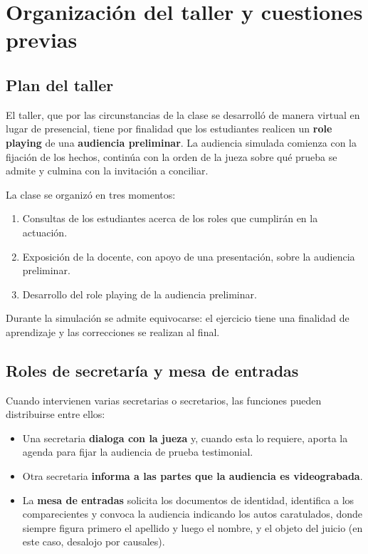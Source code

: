 \documentclass[12pt,oneside]{book}
\begin{document}
\tableofcontents

\chapter[Organización del taller y cuestiones previas]{Organización del taller y cuestiones previas}

\section{Plan del taller}

El taller, que por las circunstancias de la clase se desarrolló de manera virtual en lugar de presencial, tiene por finalidad que los estudiantes realicen un \textbf{role playing} de una \textbf{audiencia preliminar}. La audiencia simulada comienza con la fijación de los hechos, continúa con la orden de la jueza sobre qué prueba se admite y culmina con la invitación a conciliar.

La clase se organizó en tres momentos:

\begin{enumerate}
    \item Consultas de los estudiantes acerca de los roles que cumplirán en la actuación.
    \item Exposición de la docente, con apoyo de una presentación, sobre la audiencia preliminar.
    \item Desarrollo del role playing de la audiencia preliminar.
\end{enumerate}

Durante la simulación se admite equivocarse: el ejercicio tiene una finalidad de aprendizaje y las correcciones se realizan al final.

\section{Roles de secretaría y mesa de entradas}

Cuando intervienen varias secretarias o secretarios, las funciones pueden distribuirse entre ellos:

\begin{itemize}
    \item Una secretaria \textbf{dialoga con la jueza} y, cuando esta lo requiere, aporta la agenda para fijar la audiencia de prueba testimonial.
    \item Otra secretaria \textbf{informa a las partes que la audiencia es videograbada}.
    \item La \textbf{mesa de entradas} solicita los documentos de identidad, identifica a los comparecientes y convoca la audiencia indicando los autos caratulados, donde siempre figura primero el apellido y luego el nombre, y el objeto del juicio (en este caso, desalojo por causales).
\end{itemize}
\end{document}
